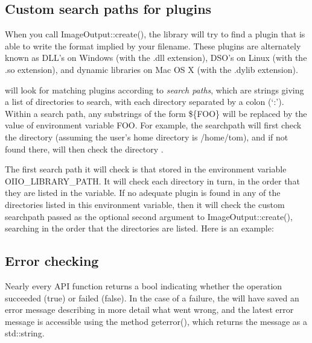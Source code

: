 \subsection{Custom search paths for plugins}
\label{sec:imageoutput:searchpaths}

When you call {\cf ImageOutput::create()}, the \product library will try
to find a plugin that is able to write the format implied by your
filename.  These plugins are alternately known as DLL's on Windows (with
the {\cf .dll} extension), DSO's on Linux (with the {\cf .so}
extension), and dynamic libraries on Mac OS X (with the {\cf .dylib}
extension).  

\product will look for matching plugins according to
\emph{search paths}, which are strings giving a list of directories to
search, with each directory separated by a colon (`{\cf :}').  Within
a search path, any
substrings of the form {\cf \$\{FOO\}} will be replaced
by the value of environment variable {\cf FOO}.  For
example, the searchpath 
will first check the directory  (assuming the
user's home directory is {\cf /home/tom}), and if not
found there, will then check the directory .

The first search path it will check is that stored in the environment
variable {\cf OIIO_LIBRARY_PATH}.  It will check each directory in
turn, in the order that they are listed in the variable.  If no adequate
plugin is found in any of the directories listed in this environment
variable, then it will check the custom searchpath passed as the
optional second argument to {\cf ImageOutput::create()}, searching in
the order that the directories are listed.  Here is an example:



\subsection{Error checking}
\label{sec:imageoutput:errors}

Nearly every \ImageOutput API function returns a {\cf bool} indicating
whether the operation succeeded ({\cf true}) or failed ({\cf false}).
In the case of a failure, the \ImageOutput will have saved an error
message describing in more detail what went wrong, and the latest
error message is accessible using the \ImageOutput method 
{\cf geterror()}, which returns the message as a {\cf std::string}.

